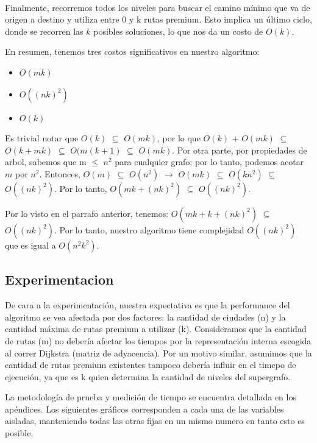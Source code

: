\\
\par
Finalmente, recorremos todos los niveles para buscar el camino mínimo que va de origen a destino y utiliza entre 0 y k rutas premium. Esto implica un último ciclo, donde se recorren las $k$ posibles soluciones, lo que nos da un costo de $O(k)$.
\\
\par
En resumen, tenemos tres costos significativos en nuestro algoritmo:
\begin{itemize}
\item $O(mk)$
\item $O((nk)^2)$
\item $O(k)$
\end{itemize}
Es trivial notar que $O(k)$ $\subseteq$ $O(mk)$, por lo que $O(k)$ + $O(mk)$ $\subseteq$ $O(k + mk)$ $\subseteq$ $O(m(k+1)$ $\subseteq$ $O(mk)$. Por otra parte, por propiedades de arbol, sabemos que m $\leq$ $n^2$ para cualquier grafo; por lo tanto, podemos acotar $m$ por $n^2$. Entonces, $O(m)$ $\subseteq$ $O(n^2)$ $\rightarrow$ $O(mk)$ $\subseteq$ $O(kn^2)$ $\subseteq$ $O((nk)^2)$. Por lo tanto, $O(mk + (nk)^2)$ $\subseteq$ $O((nk)^2)$.
\\
\par
Por lo visto en el parrafo anterior, tenemos: $O(mk + k + (nk)^2)$ $\subseteq$ $O((nk)^2)$. Por lo tanto, nuestro algoritmo tiene complejidad $O((nk)^2)$ que es igual a $O(n^2k^2)$.

\subsection{Experimentacion}

De cara a la experimentación, nuestra expectativa es que la performance del algoritmo se vea afectada por dos factores: la cantidad de ciudades (n) y la cantidad máxima de rutas premium a utilizar (k). Consideramos que la cantidad de rutas (m) no debería afectar los tiempos por la representación interna escogida al correr Dijkstra (matriz de adyacencia). Por un motivo similar, asumimos que la cantidad de rutas premium existentes tampoco debería influir en el timepo de ejecución, ya que es k quien determina la cantidad de niveles del supergrafo.

La metodología de prueba y medición de tiempo se encuentra detallada en los apéndices. Los siguientes gráficos corresponden a cada una de las variables aisladas, manteniendo todas las otras fijas en un mismo numero en tanto esto es posible.

